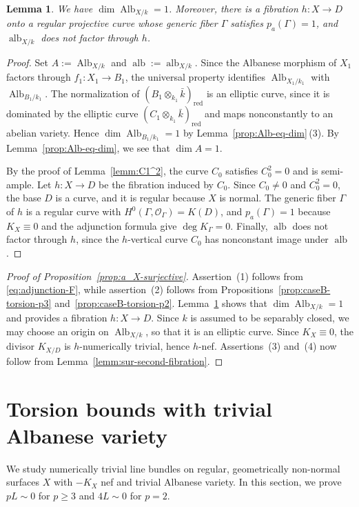 \documentclass[10pt,abstract=true]{scrartcl}
\numberwithin{equation}{section}
\newtheorem{lemma}[theorem]{Lemma}
\theoremstyle{definition}
\theoremstyle{remark}
\DeclareMathOperator\Alb{Alb}
\DeclareMathOperator\alb{alb}
\begin{document}
\begin{lemma}\label{lemm:caseB-second-fibration}%
  We have $\dim\Alb_{X/k}=1$.
  Moreover, there is a fibration $h\colon X\to D$ onto a regular projective curve whose generic fiber $\Gamma$ satisfies $p_a(\Gamma)=1$, and $\alb_{X/k}$ does not factor through $h$.
\end{lemma}
\begin{proof}
  Set $A:=\Alb_{X/k}$ and $\alb:=\alb_{X/k}$.
  Since the Albanese morphism of $X_1$ factors through $f_1\colon X_1\to B_1$, the universal property identifies $\Alb_{X_1/k_1}$ with $\Alb_{B_1/k_1}$.
  The normalization of $(B_1\otimes_{k_1}\bar k)_{\mathrm{red}}$ is an elliptic curve, since it is dominated by the elliptic curve $(C_1\otimes_{k_1}\bar k)_{\mathrm{red}}$ and maps nonconstantly to an abelian variety. Hence $\dim\Alb_{B_1/k_1}=1$ by Lemma~\ref{prop:Alb-eq-dim}\,\textup{(3)}.
  By Lemma~\ref{prop:Alb-eq-dim}, we see that $\dim A=1$.

  By the proof of Lemma~\ref{lemm:C1^2}, the curve $C_0$ satisfies $C_0^2=0$ and is semi-ample.
  Let $h\colon X\to D$ be the fibration induced by $C_0$.
  Since $C_0\neq0$ and $C_0^2=0$, the base $D$ is a curve, and it is regular because $X$ is normal.
  The generic fiber $\Gamma$ of $h$ is a regular curve with $H^0(\Gamma,\mathcal O_\Gamma)=K(D)$, and $p_a(\Gamma)=1$ because $K_X\equiv0$ and the adjunction formula give $\deg K_\Gamma=0$.
  Finally, $\alb$ does not factor through $h$, since the $h$-vertical curve $C_0$ has nonconstant image under $\alb$.
\end{proof}

\begin{proof}[Proof of Proposition~\ref{prop:a_X-surjective}]
  Assertion~(1) follows from \eqref{eq:adjunction-F}, while assertion~(2) follows from Propositions~\ref{prop:caseB-torsion-p3} and~\ref{prop:caseB-torsion-p2}.
  Lemma~\ref{lemm:caseB-second-fibration} shows that $\dim\Alb_{X/k}=1$ and provides a fibration $h\colon X\to D$.
  Since $k$ is assumed to be separably closed, we may choose an origin on $\Alb_{X/k}$, so that it is an elliptic curve.
  Since $K_X\equiv0$, the divisor $K_{X/D}$ is $h$-numerically trivial, hence $h$-nef.
  Assertions~(3) and~(4) now follow from Lemma~\ref{lemm:sur-second-fibration}.
\end{proof}


\section{Torsion bounds with trivial Albanese variety}\label{sec:proof}
We study numerically trivial line bundles on regular, geometrically non-normal surfaces $X$ with $-K_X$ nef and trivial Albanese variety.
In this section, we prove $pL\sim0$ for $p\geq3$ and $4L\sim0$ for $p=2$.
\end{document}
